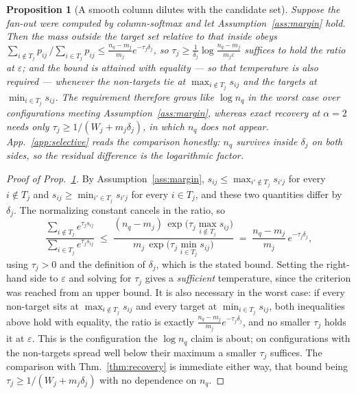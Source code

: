 \documentclass{article}
\newtheorem{proposition}{Proposition}
\begin{document}
\begin{proposition}[A smooth column dilutes with the candidate set]
\label{prop:leakage}
Suppose the fan-out were computed by column-\emph{softmax} and let Assumption~\ref{ass:margin}
hold. Then the mass outside the target set relative to that inside obeys
$\sum_{i \notin T_j} p_{ij}\,/\sum_{i \in T_j} p_{ij} \leq \frac{n_q - m_j}{m_j} e^{-\tau_j
\delta_j}$, so $\tau_j \geq \frac{1}{\delta_j}\log\frac{n_q - m_j}{m_j\varepsilon}$ \emph{suffices}
to hold the ratio at $\varepsilon$; and the bound is attained with equality --- so that
temperature is also \emph{required} --- whenever the non-targets tie at $\max_{i\notin T_j}s_{ij}$
and the targets at $\min_{i\in T_j}s_{ij}$. The requirement therefore grows like $\log n_q$ in the
worst case over configurations meeting Assumption~\ref{ass:margin}, whereas exact recovery at
$\alpha=2$ needs only $\tau_j \ge 1/(W_j+m_j\delta_j)$, in which $n_q$ does not appear.
App.~\ref{app:selective} reads the comparison honestly: $n_q$ survives inside $\delta_j$ on both
sides, so the residual difference is the logarithmic factor.
\end{proposition}

\begin{proof}[Proof of Prop.~\ref{prop:leakage}]
By Assumption~\ref{ass:margin}, $s_{ij} \leq \max_{i' \notin T_j} s_{i'j}$ for every
$i \notin T_j$ and $s_{ij} \geq \min_{i' \in T_j} s_{i'j}$ for every $i \in T_j$, and these two
quantities differ by $\delta_j$. The normalizing constant cancels in the ratio, so
\begin{equation*}
\frac{\sum_{i \notin T_j} e^{\tau_j s_{ij}}}{\sum_{i \in T_j} e^{\tau_j s_{ij}}}
\;\leq\; \frac{(n_q - m_j)\,\exp\!\big(\tau_j \max_{i \notin T_j} s_{ij}\big)}
{m_j\,\exp\!\big(\tau_j \min_{i \in T_j} s_{ij}\big)}
\;=\; \frac{n_q - m_j}{m_j}\,e^{-\tau_j \delta_j},
\end{equation*}
using $\tau_j > 0$ and the definition of $\delta_j$, which is the stated bound. Setting the
right-hand side to $\varepsilon$ and solving for $\tau_j$ gives a \emph{sufficient} temperature,
since the criterion was reached from an upper bound. It is also necessary in the worst case:
if every non-target sits at $\max_{i\notin T_j}s_{ij}$ and every target at
$\min_{i\in T_j}s_{ij}$, both inequalities above hold with equality, the ratio is exactly
$\frac{n_q-m_j}{m_j}e^{-\tau_j\delta_j}$, and no smaller $\tau_j$ holds it at $\varepsilon$. This
is the configuration the $\log n_q$ claim is about; on configurations with the non-targets spread
well below their maximum a smaller $\tau_j$ suffices. The comparison with
Thm.~\ref{thm:recovery} is immediate either way, that bound being
$\tau_j \geq 1/(W_j+m_j\delta_j)$ with no dependence on $n_q$.
\end{proof}
\end{document}
